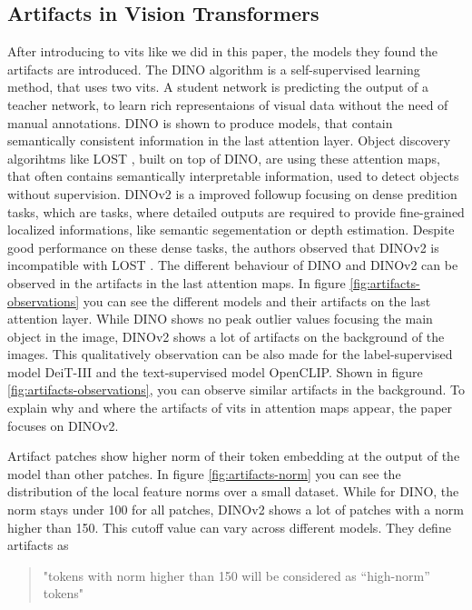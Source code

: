 \documentclass[conference]{IEEEtran}
\begin{document}
  \subsection{Artifacts in Vision Transformers}


  After introducing to \acp{vit} like we did in this paper, the models they found the artifacts are introduced. The DINO algorithm is a self-supervised learning method, that uses two \acp{vit}. A student network is predicting the output of a teacher network, to learn rich representaions of visual data without the need of manual annotations. \cite{dino} DINO is shown to produce models, that contain semantically consistent information in the last attention layer. Object discovery algorihtms like LOST \cite{lost}, built on top of DINO, are using these attention maps, that often contains semantically interpretable information, used to detect objects without supervision. DINOv2 \cite{dinov2} is a improved followup focusing on dense predition tasks, which are tasks, where detailed outputs are required to provide fine-grained localized informations, like semantic segementation or depth estimation. Despite good performance on these dense tasks, the authors observed that DINOv2 is incompatible with LOST \cite{registers}. The different behaviour of DINO and DINOv2 can be observed in the artifacts in the last attention maps. In figure \ref{fig:artifacts-observations} you can see the different models and their artifacts on the last attention layer.
  While DINO shows no peak outlier values focusing the main object in the image, DINOv2 shows a lot of artifacts on the background of the images. This qualitatively observation can be also made for the label-supervised model DeiT-III and the text-supervised model OpenCLIP. Shown in figure \ref{fig:artifacts-observations}, you can observe similar artifacts in the background.
  To explain why and where the artifacts of \acp{vit} in attention maps appear, the paper focuses on DINOv2. 

  Artifact patches show higher norm of their token embedding at the output of the model than other patches. In figure \ref{fig:artifacts-norm} you can see the distribution of the local feature norms over a small dataset. While for DINO, the norm stays under 100 for all patches, DINOv2 shows a lot of patches with a norm higher than 150. This cutoff value can vary across different models. They define artifacts as
  \begin{quote}
    "tokens with norm higher than 150 will be considered as “high-norm” tokens" \cite{registers}
  \end{quote}
\end{document}
